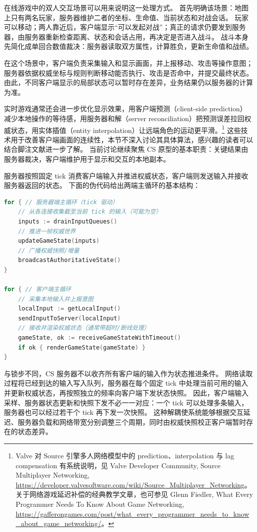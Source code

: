在线游戏中的双人交互场景可以用来说明这一处理方式。
首先明确该场景：地图上只有两名玩家，服务器维护二者的坐标、生命值、当前状态和对战会话。
玩家可以移动；两人靠近后，客户端显示“可以发起对战”；真正的请求仍要发到服务器，由服务器重新检查距离、状态和会话占用，再决定是否进入战斗。
战斗本身先简化成单回合数值裁决：服务器读取双方属性，计算胜负，更新生命值和战绩。

在这个场景中，客户端负责采集输入和显示画面，并上报移动、攻击等操作意图；服务器依据权威坐标与规则判断移动能否执行、攻击是否命中，并提交最终状态。
由此，不同客户端显示的局部状态可以暂时存在差异，业务结果仍以服务器的计算为准。

实时游戏通常还会进一步优化显示效果，用客户端预测（client-side prediction）减少本地操作的等待感，用服务器和解（server reconciliation）把预测误差拉回权威状态，用实体插值（entity interpolation）让远端角色的运动更平滑。\footnote{Valve 对 Source 引擎多人网络模型中的 prediction、interpolation 与 lag compensation 有系统说明，见 Valve Developer Community, Source Multiplayer Networking, \url{https://developer.valvesoftware.com/wiki/Source_Multiplayer_Networking}。关于网络游戏延迟补偿的经典教学文章，也可参见 Glenn Fiedler, What Every Programmer Needs To Know About Game Networking, \url{https://gafferongames.com/post/what_every_programmer_needs_to_know_about_game_networking/}。}
这些技术用于改善客户端画面的连续性，本节不深入讨论其具体算法，感兴趣的读者可以结合脚注文献进一步了解。
当前讨论继续聚焦 CS 原型的基本职责：关键结果由服务器裁决，客户端维护用于显示和交互的本地副本。

服务器按照固定 tick 消费客户端输入并推进权威状态，客户端则发送输入并接收服务器返回的状态。
下面的伪代码给出两端主循环的基本结构：
\begin{tcolorbox}[title=CS 架构伪代码结构]
\begin{lstlisting}[style=codeblock, language=go]
for { // 服务器端主循环（tick 驱动）
    // 从各连接收集截至当前 tick 的输入（可能为空）
    inputs := drainInputQueues()
    // 推进一帧权威世界
    updateGameState(inputs)
    // 广播权威快照/增量
    broadcastAuthoritativeState()
}

for { // 客户端主循环
    // 采集本地输入并上报意图
    localInput := getLocalInput()
    sendInputToServer(localInput)
    // 接收并渲染权威状态（通常带超时/断线处理）
    gameState, ok := receiveGameStateWithTimeout()
    if ok { renderGameState(gameState) }
}
\end{lstlisting}
\end{tcolorbox}

与锁步不同，CS 服务器不以收齐所有客户端的输入作为状态推进条件。
网络读取过程将已经到达的输入写入队列，服务器在每个固定 tick 中处理当前可用的输入并更新权威状态，再按照独立的频率向客户端下发状态快照。
因此，客户端输入采样、服务器状态更新和快照下发不必一一对应：一个 tick 可以处理多条输入，服务器也可以经过若干个 tick 再下发一次快照。
这种解耦使系统能够根据交互延迟、服务器负载和网络带宽分别调整三个周期，同时由权威快照校正客户端暂时存在的状态差异。

